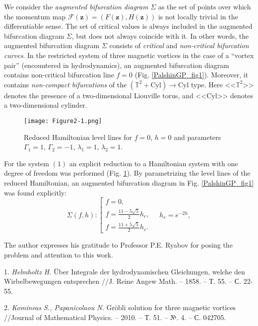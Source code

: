 \documentclass{vzmsthesis}
\begin{document}
We consider the \textit{augmented bifurcation diagram} $\Sigma$ as the set of points over which the momentum map $\mathcal{F}(\boldsymbol{z})=(F(\boldsymbol{z}),H(\boldsymbol{z}))$ is not locally trivial in the differentiable sense. The set of critical values is always included in the augmented bifurcation diagram $\Sigma$, but does not always coincide with it. In other words, the augmented bifurcation diagram $\Sigma$ consists of \textit{critical} and \textit{non-critical bifurcation curves}. In the restricted system of three magnetic vortices in the case of a ``vortex pair'' (encountered in hyd\-ro\-dyna\-mics), an augmented bifurcation diagram contains non-critical bifurcation line $f=0$ (Fig. \ref{PalshinGP_fig1}). Moreover, it contains \textit{non-compact bifurcations} of the $\left( \mathbb{T}^2 + \mathrm{Cyl} \right) \rightarrow \mathrm{Cyl}$ type. Here <<$\mathbb{T}^2$>> denotes the presence of a two-dimensional Liouville torus, and <<$\mathrm{Cyl}$>> denotes a two-dimensional cylinder.

\begin{figure}[!t]
  \centering
  \texttt{[image: Figure2-1.png]}
  \caption{Reduced Hamiltonian level lines for $f=0$, $h = 0$ and parameters $\Gamma_1=1$, $\Gamma_2=-1$, $\lambda_1=1$, $\lambda_2=1$.}\label{PalshinGP_fig2}
\end{figure}

For the system $(1)$ an explicit reduction to a Hamiltonian system with one degree of freedom was performed (Fig. \ref{PalshinGP_fig2}). By pa\-ra\-met\-ri\-zing the level lines of the reduced Hamiltonian, an aug\-men\-ted bi\-fur\-ca\-tion diagram in Fig. \ref{PalshinGP_fig1} was found explicitly:
\begin{equation*}
\Sigma(f,h): \left[
\begin{array}{l}
\displaystyle{
f=0,}
\\[3mm]
\displaystyle{
f=\frac{11-5\sqrt{5}}{2} h_e,}
\\[3mm]
\displaystyle{
f=\frac{11+5\sqrt{5}}{2} h_e.}
\end{array}
\right.
\quad
h_e=e^{-2h},
\end{equation*}

The author expresses his gratitude to Professor P.E. Ryabov for posing the problem and attention to this work.

\litlist

1. {\it Helmholtz H.}
  \"{U}ber Integrale der hydrodynamischen Glei\-chun\-gen, welche den Wirbelbewegungen entsprechen //J. Reine Angew Math. -- 1858. -- Т. 55. -- С. 22-55.

2. {\it Komineas S., Papanicolaou N.}
 Gr\"{o}bli solution for three magnetic vortices //Journal of Mathematical Physics. -- 2010. -- Т. 51. -- №. 4. -- С. 042705.
%
%

\end{document}
